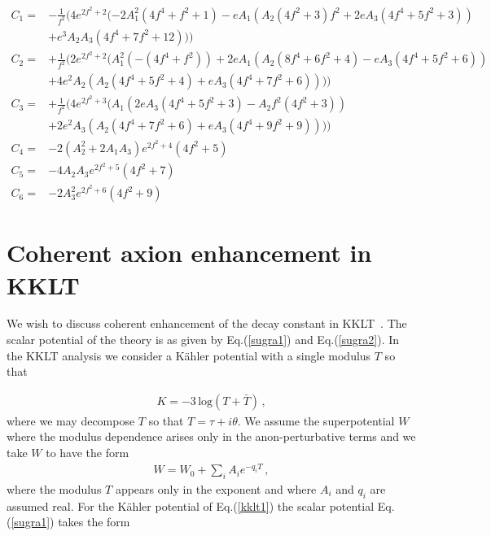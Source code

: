 \documentclass[12pt]{article}
\begin{document}
\begin{align}
  C_1 = & - \frac{1}{f^2} (4 {e}^{2 {f}^{2} + 2} ( - 2 {A}_{1}^{2} \left( 4 {f}^{4} + {f}^{2} + 1 \right) - e {A}_{1} \left( {A}_{2} \left( 4 {f}^{2} + 3 \right)  {f}^{2} + 2 e {A}_{3} \left( 4 {f}^{4} + 5 {f}^{2} + 3 \right) \right) \nonumber\\
        & + {e}^{3} {A}_{2} {A}_{3} \left( 4 {f}^{4} + 7 {f}^{2} + 12 \right) ))\nonumber\\
  C_2= & + \frac{1}{f^2}(2 {e}^{2 {f}^{2} + 2} ( {A}_{1}^{2} \left( - \left( 4 {f}^{4} + {f}^{2} \right) \right) + 2 e {A}_{1} \left( {A}_{2} \left( 8 {f}^{4} + 6 {f}^{2} + 4 \right) - e {A}_{3} \left( 4 {f}^{4} + 5 {f}^{2} + 6 \right) \right) \nonumber\\
        & + 4 {e}^{2} {A}_{2} \left( {A}_{2} \left( 4 {f}^{4} + 5 {f}^{2} + 4 \right) + e {A}_{3} \left( 4 {f}^{4} + 7 {f}^{2} + 6 \right) \right) ))\nonumber\\
  C_3= & + \frac{1}{f^2}(4 {e}^{2 {f}^{2} + 3} ( {A}_{1} \left( 2 e {A}_{3} \left( 4 {f}^{4} + 5 {f}^{2} + 3 \right) - {A}_{2} {f}^{2} \left( 4 {f}^{2} + 3 \right) \right) \nonumber\\
        & + 2 {e}^{2} {A}_{3} \left( {A}_{2} \left( 4 {f}^{4} + 7 {f}^{2} + 6 \right) + e {A}_{3} \left( 4 {f}^{4} + 9 {f}^{2} + 9 \right) \right) ))\nonumber\\
  C_4= & - 2 \left( {A}_{2}^{2} + 2 {A}_{1} {A}_{3} \right)  {e}^{2 {f}^{2} + 4} \left( 4 {f}^{2} + 5 \right) \nonumber\\
  C_5= & - 4 {A}_{2} {A}_{3} {e}^{2 {f}^{2} + 5} \left( 4 {f}^{2} + 7 \right) \nonumber\\
  C_6= & - 2 {A}_{3}^{2} {e}^{2 {f}^{2} + 6} \left( 4 {f}^{2} + 9 \right)
  \label{c1}
\end{align}


\section{Coherent axion enhancement in KKLT\label{sec5}}
We wish to discuss coherent enhancement of the decay constant in KKLT~\cite{Kachru:2003aw}.
The scalar potential of the theory is as given by Eq.(\ref{sugra1}) and Eq.(\ref{sugra2}).
In the KKLT analysis we consider a K\"ahler potential with a single modulus $T$ so that

\begin{align}
  K = -3 \, \text{log}(T+ \bar T)\,,
  \label{kklt1}
\end{align}
where we may decompose $T$ so that
$T= \tau + i \theta$.
We assume the superpotential $W$ where the modulus dependence arises only in the anon-perturbative terms
and we take $W$ to have the form
\begin{align}
  W= W_0 +\sum_{i} A_i e^{- q_iT}\,,
  \label{w0A}
\end{align}
where the modulus $T$ appears only in the exponent and where $A_i$ and $q_i$ are assumed real.
For the K\"ahler potential of Eq.(\ref{kklt1}) the scalar potential Eq. (\ref{sugra1}) takes the form
\end{document}
